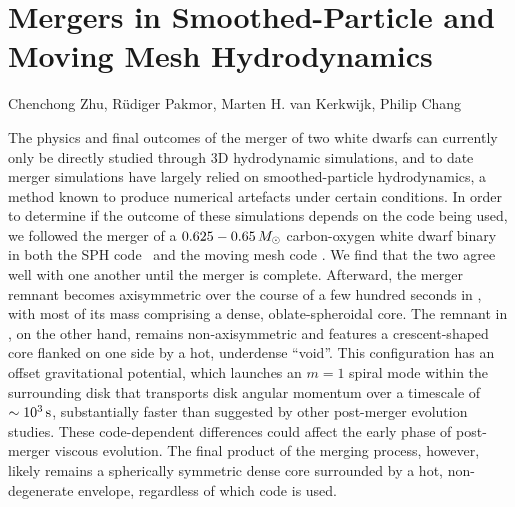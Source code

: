 \chapter{Mergers in Smoothed-Particle and Moving Mesh Hydrodynamics}
\label{ch:ch3}

\begin{center}
\begin{minipage}[c]{4.75in}
Chenchong Zhu, R\"{u}diger Pakmor, Marten H. van Kerkwijk, Philip Chang\\
\vspace{2em}
\end{minipage}
\end{center}

The physics and final outcomes of the merger of two white dwarfs can currently only be directly studied through 3D hydrodynamic simulations, and to date merger simulations have largely relied on smoothed-particle hydrodynamics, a method known to produce numerical artefacts under certain conditions.  In order to determine if the outcome of these simulations depends on the code being used, we followed the merger of a $0.625 - 0.65\,\Msun$ carbon-oxygen white dwarf binary in both the SPH code \gasoline\ and the moving mesh code \arepo.  We find that the two agree well with one another until the merger is complete.  Afterward, the merger remnant becomes axisymmetric over the course of a few hundred seconds in \gasoline, with most of its mass comprising a dense, oblate-spheroidal core.  The remnant in \arepo, on the other hand, remains non-axisymmetric and features a crescent-shaped core flanked on one side by a hot, underdense ``void''.  This configuration has an offset gravitational potential, which launches an $m = 1$ spiral mode within the surrounding disk that transports disk angular momentum over a timescale of $\sim10^3\,\mathrm{s}$, substantially faster than suggested by other post-merger evolution studies.  These code-dependent differences could affect the early phase of post-merger viscous evolution.  The final product of the merging process, however, likely remains a spherically symmetric dense core surrounded by a hot, non-degenerate envelope, regardless of which code is used.

